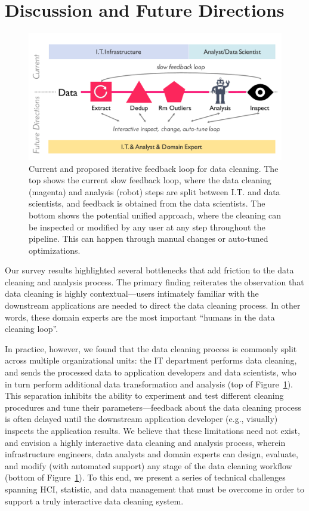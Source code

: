 \section{Discussion and Future Directions}\label{sec:future}


\begin{figure}[ht]
  \centering
  \includegraphics[width=.95\columnwidth]{datafigs/arch}
  \caption{Current and proposed iterative feedback loop for data cleaning.  
  The top shows the current slow feedback loop, where the data cleaning (magenta) and analysis (robot) steps are split between I.T. and data scientists, and feedback is obtained from the data scientists. 
  The bottom shows the potential unified approach, where the cleaning can be inspected or modified by any user at any step throughout the pipeline.  This can happen through manual changes or auto-tuned optimizations.
  }
  \label{f:arch}
\end{figure}

Our survey results highlighted several bottlenecks that add friction to the data cleaning and analysis process.
The primary finding reiterates the observation that data cleaning is highly contextual---users intimately familiar with the downstream applications are needed to direct the data cleaning process.  In other words, these domain experts are the most important ``humans in the data cleaning loop''.  

In practice, however, we found that the data cleaning process is commonly split across multiple organizational units: the IT department performs data cleaning, and sends the processed data to application developers and data scientists, who in turn perform additional data transformation and analysis (top of Figure~\ref{f:arch}).  This separation inhibits the ability to experiment and test different cleaning procedures and tune their parameters---feedback about the data cleaning process is often delayed until the downstream application developer (e.g., visually) inspects the application results.  We believe that these limitations need not exist, and envision a highly interactive data cleaning and analysis process, wherein infrastructure engineers, data analysts and domain experts can design, evaluate, and modify (with automated support) any stage of the data cleaning workflow (bottom of Figure~\ref{f:arch}). To this end, we present a series of technical challenges spanning HCI, statistic, and data management that must be overcome in order to support a truly interactive data cleaning system.

